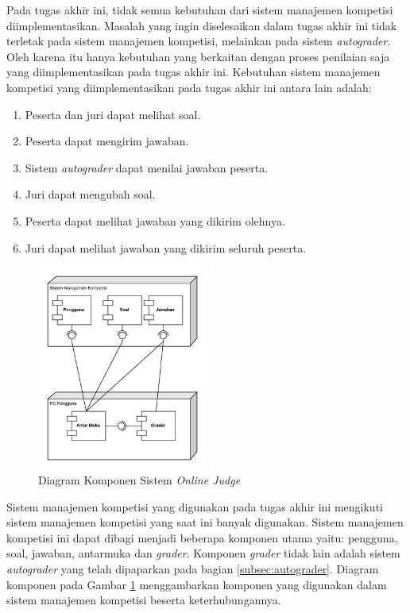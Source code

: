 \par Pada tugas akhir ini, tidak semua kebutuhan dari sistem manajemen kompetisi diimplementasikan. Masalah yang ingin diselesaikan dalam tugas akhir ini tidak terletak pada sistem manajemen kompetisi, melainkan pada sistem \textit{autograder}. Oleh karena itu hanya kebutuhan yang berkaitan dengan proses penilaian saja yang diimplementasikan pada tugas akhir ini. Kebutuhan sistem manajemen kompetisi yang diimplementasikan pada tugas akhir ini antara lain adalah:

\begin{enumerate}
    \item Peserta dan juri dapat melihat soal.
    \item Peserta dapat mengirim jawaban.
    \item Sistem \textit{autograder} dapat menilai jawaban peserta.
    \item Juri dapat mengubah soal.
    \item Peserta dapat melihat jawaban yang dikirim olehnya.
    \item Juri dapat melihat jawaban yang dikirim seluruh peserta.
\end{enumerate}

\begin{figure}[ht!]
    \centering
    \includegraphics[width=0.5\textwidth]{images/oj-components}
    \caption{Diagram Komponen Sistem \textit{Online Judge}}
    \label{fig:oj-components}
\end{figure}

\par Sistem manajemen kompetisi yang digunakan pada tugas akhir ini mengikuti sistem manajemen kompetisi yang saat ini banyak digunakan. Sistem manajemen kompetisi ini dapat dibagi menjadi beberapa komponen utama yaitu: pengguna, soal, jawaban, antarmuka dan \textit{grader}. Komponen \textit{grader} tidak lain adalah sistem \textit{autograder} yang telah dipaparkan pada bagian \ref{subsec:autograder}. Diagram komponen pada Gambar \ref{fig:oj-components} menggambarkan komponen yang digunakan dalam sistem manajemen kompetisi beserta keterhubungannya.

